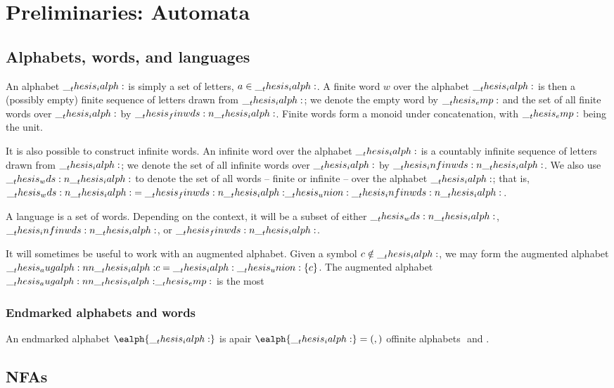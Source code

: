 \chapter{Preliminaries: Automata}\label{ch:automata}

\section{Alphabets, words, and languages}

An alphabet $\__thesis_ialph:$ is simply a set of letters, $a \in \__thesis_ialph:$.
A finite word $w$ over the alphabet $\__thesis_ialph:$ is then a (possibly empty) finite sequence of letters drawn from $\__thesis_ialph:$;
we denote the empty word by $\__thesis_emp:$ and the set of all finite words over $\__thesis_ialph:$ by $\__thesis_finwds:n {\__thesis_ialph:}$.
Finite words form a monoid under concatenation, with $\__thesis_emp:$ being the unit.

It is also possible to construct infinite words.
An infinite word over the alphabet $\__thesis_ialph:$ is a countably infinite sequence of letters drawn from $\__thesis_ialph:$;
we denote the set of all infinite words over $\__thesis_ialph:$ by $\__thesis_infinwds:n {\__thesis_ialph:}$.
We also use $\__thesis_wds:n {\__thesis_ialph:}$ to denote the set of all words -- finite or infinite -- over the alphabet $\__thesis_ialph:$; that is, $\__thesis_wds:n {\__thesis_ialph:} = \__thesis_finwds:n {\__thesis_ialph:} \__thesis_union: \__thesis_infinwds:n {\__thesis_ialph:}$.

A language is a set of words.
Depending on the context, it will be a subset of either $\__thesis_wds:n {\__thesis_ialph:}$, $\__thesis_infinwds:n {\__thesis_ialph:}$, or $\__thesis_finwds:n {\__thesis_ialph:}$.

It will sometimes be useful to work with an augmented alphabet.
Given a symbol $c \notin \__thesis_ialph:$, we may form the augmented alphabet $\__thesis_augalph:nn {\__thesis_ialph:} {c} = \__thesis_ialph: \__thesis_union: \{c\}$.
The augmented alphabet $\__thesis_augalph:nn {\__thesis_ialph:} {\__thesis_emp:}$ is the most

\subsection{Endmarked alphabets and words}

An endmarked alphabet $\ealph{\ialph}$ is apair $\ealph{\ialph} = (, )$ offinite alphabets $ $ and $ $.

\section{\Aclp*{NFA}}

